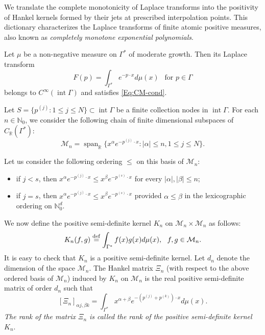 \documentclass[11pt,reqno]{amsart}
\theoremstyle{plain}
\theoremstyle{definition}
\numberwithin{equation}{section}
\newcommand{\bydef}{\stackrel{\rm def}{=}}
\begin{document}
     We translate the complete monotonicity of Laplace transforms into the positivity of Hankel kernels formed by their jets at prescribed interpolation points. This dictionary characterizes the Laplace transforms of finite atomic positive measures, also known as {\em completely monotone exponential polynomials}.

	Let $\mu$ be a non-negative measure on $\Gamma^*$ of moderate growth. Then its Laplace transform
	$$
	F(p)= \int_{\Gamma^*} e^{-p\cdot x} d\mu(x) \ \ \text{ for } p \in \Gamma
	$$
	belongs to $C^\infty(\operatorname{int} \Gamma)$ and satisfies \eqref{Eq:CM-cond}.
	
	Let $S=\{ p^{(j)} : 1\leq j \leq N\} \subset \operatorname{int} \Gamma$ be a finite collection nodes in $\operatorname{int} \Gamma$. 
	For each $n \in \mathbb{N}_0$, we consider the following chain of finite dimensional subspaces of $C_\mathbb{R}(\Gamma^*)$:
	$$
	\mathcal{M}_n = \operatorname{span}_{\mathbb{R}} \{x^\alpha e^{-p^{(j)} \cdot x}: |\alpha| \leq n, 1\leq j \leq N \}.
	$$

    Let us consider the following ordering $\leq$ on this basis of $\mathcal{M}_n$: 
    \begin{itemize}
        \item[(i)] if $j < s$, then $x^\alpha e^{-p^{(j)}\cdot x} \leq x^\beta e^{-p^{(s)}\cdot x}$ for every $|\alpha|, |\beta| \leq n$;
        \item[(ii)] if $j=s$, then $x^\alpha e^{-p^{(j)}\cdot x} \leq x^\beta e^{-p^{(s)}\cdot x}$ provided $\alpha \leq \beta$ in the lexicographic ordering on $\mathbb{N}_0^d$.
    \end{itemize}
	We now define the positive semi-definite kernel $K_n$ on $\mathcal{M}_n \times \mathcal{M}_n$ as follows:
	$$
	K_n( f, g) \bydef \int_{\Gamma^*} f(x) g(x) d\mu(x), \ \ f, g \in \mathcal{M}_n.
	$$
	It is easy to check that $K_n$ is a positive semi-definite kernel. 
	Let $d_n$ denote the dimension of the space $\mathcal M_n$. The Hankel matrix $\Xi_{n}$ (with respect to the above ordered basis of $\mathcal{M}_n$) induced by $K_n$ on $\mathcal M_n$ is the real positive semi-definite matrix of order $d_n$ such that
	\[
	\left[\Xi_{n}\right]_{\alpha j, \beta k}=\int_{\Gamma^*} x^{\alpha+\beta} e^{-(p^{(j)} + p^{(k)}) \cdot x} d\mu(x).
	\]
	{\em The rank of the matrix $\Xi_n$ is called the rank of the positive semi-definite kernel $K_n$}.
	\bigskip
	
\end{document}
